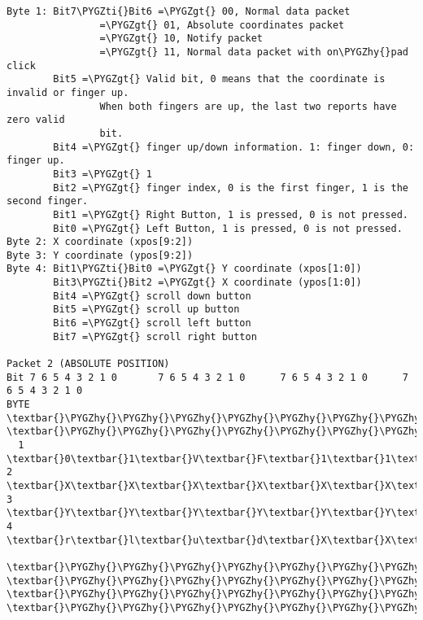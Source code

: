 \documentclass[a4paper,8pt,english]{sphinxmanual}
\def\PYGZgt{\char`\>}
\def\PYGZhy{\char`\-}
\def\PYGZti{\char`\~}
\begin{document}
\begin{Verbatim}[commandchars=\\\{\}]
Byte 1: Bit7\PYGZti{}Bit6 =\PYGZgt{} 00, Normal data packet
                =\PYGZgt{} 01, Absolute coordinates packet
                =\PYGZgt{} 10, Notify packet
                =\PYGZgt{} 11, Normal data packet with on\PYGZhy{}pad click
        Bit5 =\PYGZgt{} Valid bit, 0 means that the coordinate is invalid or finger up.
                When both fingers are up, the last two reports have zero valid
                bit.
        Bit4 =\PYGZgt{} finger up/down information. 1: finger down, 0: finger up.
        Bit3 =\PYGZgt{} 1
        Bit2 =\PYGZgt{} finger index, 0 is the first finger, 1 is the second finger.
        Bit1 =\PYGZgt{} Right Button, 1 is pressed, 0 is not pressed.
        Bit0 =\PYGZgt{} Left Button, 1 is pressed, 0 is not pressed.
Byte 2: X coordinate (xpos[9:2])
Byte 3: Y coordinate (ypos[9:2])
Byte 4: Bit1\PYGZti{}Bit0 =\PYGZgt{} Y coordinate (xpos[1:0])
        Bit3\PYGZti{}Bit2 =\PYGZgt{} X coordinate (ypos[1:0])
        Bit4 =\PYGZgt{} scroll down button
        Bit5 =\PYGZgt{} scroll up button
        Bit6 =\PYGZgt{} scroll left button
        Bit7 =\PYGZgt{} scroll right button

Packet 2 (ABSOLUTE POSITION)
Bit 7 6 5 4 3 2 1 0       7 6 5 4 3 2 1 0      7 6 5 4 3 2 1 0      7 6 5 4 3 2 1 0
BYTE  \textbar{}\PYGZhy{}\PYGZhy{}\PYGZhy{}\PYGZhy{}\PYGZhy{}\PYGZhy{}\PYGZhy{}\PYGZhy{}\PYGZhy{}\PYGZhy{}\PYGZhy{}\PYGZhy{}\PYGZhy{}\PYGZhy{}\PYGZhy{}\textbar{}BYTE \textbar{}\PYGZhy{}\PYGZhy{}\PYGZhy{}\PYGZhy{}\PYGZhy{}\PYGZhy{}\PYGZhy{}\PYGZhy{}\PYGZhy{}\PYGZhy{}\PYGZhy{}\PYGZhy{}\PYGZhy{}\PYGZhy{}\PYGZhy{}\textbar{}BYTE\textbar{}\PYGZhy{}\PYGZhy{}\PYGZhy{}\PYGZhy{}\PYGZhy{}\PYGZhy{}\PYGZhy{}\PYGZhy{}\PYGZhy{}\PYGZhy{}\PYGZhy{}\PYGZhy{}\PYGZhy{}\PYGZhy{}\PYGZhy{}\textbar{}BYTE\textbar{}\PYGZhy{}\PYGZhy{}\PYGZhy{}\PYGZhy{}\PYGZhy{}\PYGZhy{}\PYGZhy{}\PYGZhy{}\PYGZhy{}\PYGZhy{}\PYGZhy{}\PYGZhy{}\PYGZhy{}\PYGZhy{}\PYGZhy{}\textbar{}
  1   \textbar{}0\textbar{}1\textbar{}V\textbar{}F\textbar{}1\textbar{}1\textbar{}R\textbar{}L\textbar{}  2  \textbar{}X\textbar{}X\textbar{}X\textbar{}X\textbar{}X\textbar{}X\textbar{}X\textbar{}X\textbar{}  3 \textbar{}Y\textbar{}Y\textbar{}Y\textbar{}Y\textbar{}Y\textbar{}Y\textbar{}Y\textbar{}Y\textbar{}  4 \textbar{}r\textbar{}l\textbar{}u\textbar{}d\textbar{}X\textbar{}X\textbar{}Y\textbar{}Y\textbar{}
      \textbar{}\PYGZhy{}\PYGZhy{}\PYGZhy{}\PYGZhy{}\PYGZhy{}\PYGZhy{}\PYGZhy{}\PYGZhy{}\PYGZhy{}\PYGZhy{}\PYGZhy{}\PYGZhy{}\PYGZhy{}\PYGZhy{}\PYGZhy{}\textbar{}     \textbar{}\PYGZhy{}\PYGZhy{}\PYGZhy{}\PYGZhy{}\PYGZhy{}\PYGZhy{}\PYGZhy{}\PYGZhy{}\PYGZhy{}\PYGZhy{}\PYGZhy{}\PYGZhy{}\PYGZhy{}\PYGZhy{}\PYGZhy{}\textbar{}    \textbar{}\PYGZhy{}\PYGZhy{}\PYGZhy{}\PYGZhy{}\PYGZhy{}\PYGZhy{}\PYGZhy{}\PYGZhy{}\PYGZhy{}\PYGZhy{}\PYGZhy{}\PYGZhy{}\PYGZhy{}\PYGZhy{}\PYGZhy{}\textbar{}    \textbar{}\PYGZhy{}\PYGZhy{}\PYGZhy{}\PYGZhy{}\PYGZhy{}\PYGZhy{}\PYGZhy{}\PYGZhy{}\PYGZhy{}\PYGZhy{}\PYGZhy{}\PYGZhy{}\PYGZhy{}\PYGZhy{}\PYGZhy{}\textbar{}


\end{Verbatim}
\end{document}
